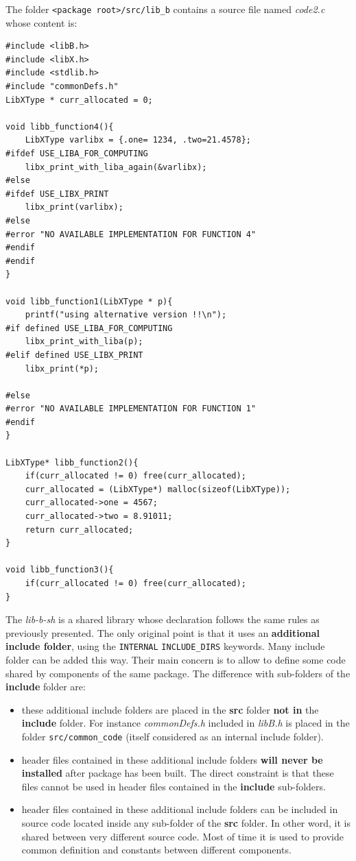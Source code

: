 \documentclass[12pt,a4paper]{article}
\begin{document}
The folder \texttt{<package root>/src/lib\_b} contains a source file named \textit{code2.c} whose content is: 
\begin{verbatim}
#include <libB.h>
#include <libX.h>
#include <stdlib.h>
#include "commonDefs.h"
LibXType * curr_allocated = 0;

void libb_function4(){
	LibXType varlibx = {.one= 1234, .two=21.4578};
#ifdef USE_LIBA_FOR_COMPUTING
	libx_print_with_liba_again(&varlibx);
#else 
#ifdef USE_LIBX_PRINT
	libx_print(varlibx);
#else
#error "NO AVAILABLE IMPLEMENTATION FOR FUNCTION 4"
#endif
#endif
}

void libb_function1(LibXType * p){
	printf("using alternative version !!\n");
#if defined USE_LIBA_FOR_COMPUTING
	libx_print_with_liba(p);
#elif defined USE_LIBX_PRINT
	libx_print(*p);

#else
#error "NO AVAILABLE IMPLEMENTATION FOR FUNCTION 1"
#endif
}

LibXType* libb_function2(){
	if(curr_allocated != 0) free(curr_allocated);
	curr_allocated = (LibXType*) malloc(sizeof(LibXType));
	curr_allocated->one = 4567;
	curr_allocated->two = 8.91011;
	return curr_allocated;
}

void libb_function3(){
	if(curr_allocated != 0) free(curr_allocated);
}
\end{verbatim}

The \textit{lib-b-sh} is a shared library whose declaration follows the same rules as previously presented. The only original point is that it uses an \textbf{additional include folder}, using the \texttt{INTERNAL} \texttt{INCLUDE\_DIRS} keywords. Many include folder can be added this way. Their main concern is to allow to define some code shared by components of the same package. The difference with sub-folders of the \textbf{include} folder are:
\begin{itemize}
\item these additional include folders are placed in the \textbf{src} folder \textbf{not in} the \textbf{include} folder. For instance \textit{commonDefs.h} included in \textit{libB.h} is placed in the folder \texttt{src/common\_code} (itself considered as an internal include folder).
\item header files contained in these additional include folders \textbf{will never be installed} after package has been built. The direct constraint is that these files cannot be used in header files contained in the \textbf{include} sub-folders.
\item header files contained in these additional include folders can be included in source code located inside any sub-folder of the \textbf{src} folder. In other word, it is shared between very different source code. Most of time it is used to provide common definition and constants between different components.
\end{itemize}
\end{document}
